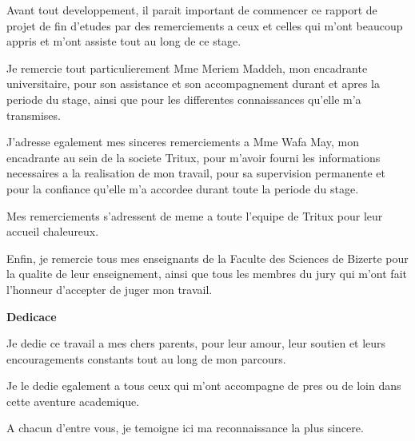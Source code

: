 
Avant tout developpement, il parait important de commencer ce rapport de projet de fin d'etudes par des remerciements a ceux et celles qui m'ont beaucoup appris et m'ont assiste tout au long de ce stage.

Je remercie tout particulierement Mme Meriem Maddeh, mon encadrante universitaire, pour son assistance et son accompagnement durant et apres la periode du stage, ainsi que pour les differentes connaissances qu'elle m'a transmises.

J'adresse egalement mes sinceres remerciements a Mme Wafa May, mon encadrante au sein de la societe Tritux, pour m'avoir fourni les informations necessaires a la realisation de mon travail, pour sa supervision permanente et pour la confiance qu'elle m'a accordee durant toute la periode du stage.

Mes remerciements s'adressent de meme a toute l'equipe de Tritux pour leur accueil chaleureux.

Enfin, je remercie tous mes enseignants de la Faculte des Sciences de Bizerte pour la qualite de leur enseignement, ainsi que tous les membres du jury qui m'ont fait l'honneur d'accepter de juger mon travail.

\vspace{1.5em}
\textbf{Dedicace}

Je dedie ce travail a mes chers parents, pour leur amour, leur soutien et leurs encouragements constants tout au long de mon parcours.

Je le dedie egalement a tous ceux qui m'ont accompagne de pres ou de loin dans cette aventure academique.

A chacun d'entre vous, je temoigne ici ma reconnaissance la plus sincere.

\MediaOptionLogicBlank